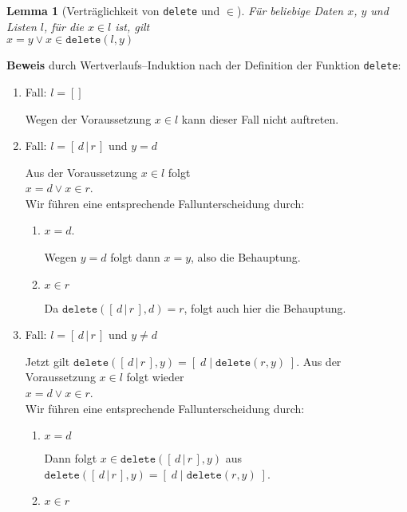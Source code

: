 \documentclass{article}
\newtheorem{Lemma}[Definition]{Lemma}
\begin{document}
\begin{Lemma}[Vertr\"aglichkeit von \texttt{delete} und $\in$] 
\label{l8}
F\"ur beliebige Daten $x$, $y$ und Listen $l$, 
f\"ur die $x\in l$ ist, gilt \\[0.1cm]
\hspace*{1.3cm} $x = y \vee x \in \mathtt{delete}(l,y)$
\end{Lemma}
\textbf{Beweis} durch Wertverlaufs--Induktion nach der Definition der Funktion \texttt{delete}:
\begin{enumerate}
\item Fall: $l = []$

      Wegen der Voraussetzung $x \in l$ kann dieser Fall nicht auftreten.
\item Fall: $l = [\,d\,|\,r\,]$ und $y = d$

      Aus der Voraussetzung $x \in l$ folgt \\[0.1cm]
      \hspace*{1.3cm} $x = d \vee x \in r$.  \\[0.1cm]
      Wir f\"uhren eine entsprechende Fallunterscheidung durch:
      \begin{enumerate}
      \item $x = d$.

            Wegen $y = d$ folgt dann $x = y$, also die Behauptung.
      \item $x \in r$

            Da $\mathtt{delete}([\,d\,|\,r\,],d) = r$, folgt auch hier die Behauptung.
      \end{enumerate}
\item Fall: $l = [\,d\,|\,r\,]$ und $y \not= d$

      Jetzt gilt $\mathtt{delete}([\,d\,|\,r\,],y) = [\;d\;|\;\mathtt{delete}(r,y)\;]$. 
      Aus der Voraussetzung $x \in l$ folgt wieder \\[0.1cm]
      \hspace*{1.3cm} $x = d \vee x \in r$.  \\[0.1cm]
      Wir f\"uhren eine entsprechende Fallunterscheidung durch:
      \begin{enumerate}
      \item $x= d$

            Dann folgt $x\in \mathtt{delete}([\,d\,|\,r\,],y)$ aus $\mathtt{delete}([\,d\,|\,r\,],y) = [\;d\;|\;\mathtt{delete}(r,y)\;]$. 
      \item $x \in r$


\end{enumerate}
\end{enumerate}
\end{document}
